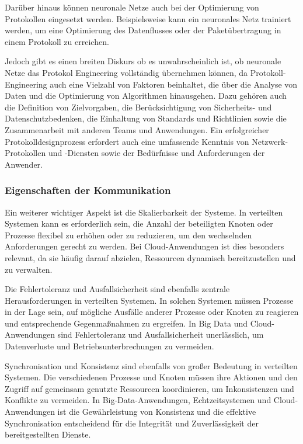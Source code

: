 Darüber hinaus können neuronale Netze auch bei der Optimierung von Protokollen eingesetzt werden. Beispielsweise kann ein neuronales Netz trainiert werden, um eine Optimierung des Datenflusses oder der Paketübertragung in einem Protokoll zu erreichen.

Jedoch gibt es einen breiten Diskurs ob es unwahrscheinlich ist, ob neuronale Netze das Protokol Engineering vollständig übernehmen können, da Protokoll-Engineering auch eine Vielzahl von Faktoren beinhaltet, die über die Analyse von Daten und die Optimierung von Algorithmen hinausgehen. Dazu gehören auch die Definition von Zielvorgaben, die Berücksichtigung von Sicherheits- und Datenschutzbedenken, die Einhaltung von Standards und Richtlinien sowie die Zusammenarbeit mit anderen Teams und Anwendungen. Ein erfolgreicher Protokolldesignprozess erfordert auch eine umfassende Kenntnis von Netzwerk-Protokollen und -Diensten sowie der Bedürfnisse und Anforderungen der Anwender.

\subsubsection{Eigenschaften der Kommunikation}
Ein weiterer wichtiger Aspekt ist die Skalierbarkeit der Systeme. In verteilten Systemen kann es erforderlich sein, die Anzahl der beteiligten Knoten oder Prozesse flexibel zu erhöhen oder zu reduzieren, um den wechselnden Anforderungen gerecht zu werden. Bei Cloud-Anwendungen ist dies besonders relevant, da sie häufig darauf abzielen, Ressourcen dynamisch bereitzustellen und zu verwalten.

Die Fehlertoleranz und Ausfallsicherheit sind ebenfalls zentrale Herausforderungen in verteilten Systemen. In solchen Systemen müssen Prozesse in der Lage sein, auf mögliche Ausfälle anderer Prozesse oder Knoten zu reagieren und entsprechende Gegenmaßnahmen zu ergreifen. In Big Data und Cloud-Anwendungen sind Fehlertoleranz und Ausfallsicherheit unerlässlich, um Datenverluste und Betriebsunterbrechungen zu vermeiden.

Synchronisation und Konsistenz sind ebenfalls von großer Bedeutung in verteilten Systemen. Die verschiedenen Prozesse und Knoten müssen ihre Aktionen und den Zugriff auf gemeinsam genutzte Ressourcen koordinieren, um Inkonsistenzen und Konflikte zu vermeiden. In Big-Data-Anwendungen, Echtzeitsystemen und Cloud-Anwendungen ist die Gewährleistung von Konsistenz und die effektive Synchronisation entscheidend für die Integrität und Zuverlässigkeit der bereitgestellten Dienste.


